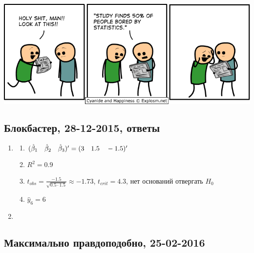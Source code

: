 \documentclass[12pt, a4paper]{article}
\begin{document}
\begin{center}
\includegraphics[scale=0.6]{figures/50_bored.png}
\end{center}


\subsection{Блокбастер, 28-12-2015, ответы}

\begin{enumerate}
\item
\begin{enumerate}
\item $(\hat{\beta}_1 \quad \hat{\beta}_2 \quad \hat{\beta}_3)' = (3 \quad 1.5 \quad -1.5)'$
\item $R^2=0.9$
\item $t_{obs} = \frac{-1.5}{\sqrt{0.5\cdot1.5}} \approx -1.73$, $t_{crit} = 4.3$, нет оснований отвергать $H_0$
\item $\hat y_6 = 6$

\end{enumerate}
\item

\end{enumerate}


\subsection{Максимально правдоподобно, 25-02-2016}
\end{document}
